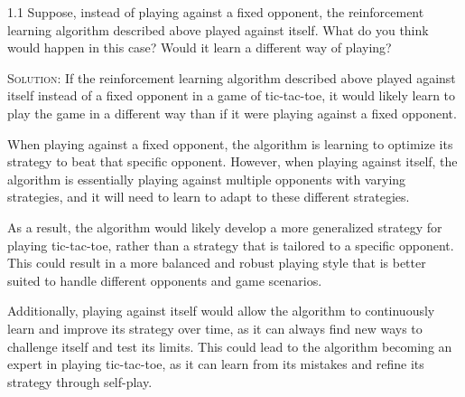 \documentclass{article}
\begin{document}
1.1 Suppose, instead of playing against a fixed opponent, the 
reinforcement learning algorithm described above played against itself. What do you 
think would happen in this case? Would it learn a different way of playing?

\textsc{Solution:} If the reinforcement learning algorithm described above played 
against itself instead of a fixed opponent in a game of tic-tac-toe, it would likely 
learn to play the game in a different way than if it were playing against a fixed 
opponent.

When playing against a fixed opponent, the algorithm is learning to optimize its 
strategy to beat that specific opponent. However, when playing against itself, the 
algorithm is essentially playing against multiple opponents with varying strategies, 
and it will need to learn to adapt to these different strategies.

As a result, the algorithm would likely develop a more generalized strategy for playing 
tic-tac-toe, rather than a strategy that is tailored to a specific opponent. This could 
result in a more balanced and robust playing style that is better suited to handle different 
opponents and game scenarios.

Additionally, playing against itself would allow the algorithm to continuously learn and 
improve its strategy over time, as it can always find new ways to challenge itself and test 
its limits. This could lead to the algorithm becoming an expert in playing tic-tac-toe, as it 
can learn from its mistakes and refine its strategy through self-play.
\end{document}
